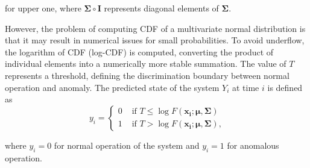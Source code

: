 for upper one, where $\boldsymbol{\Sigma}\circ\boldsymbol{I}$ represents diagonal elements of $\boldsymbol{\Sigma}$.

However, the problem of computing CDF of a multivariate normal distribution is that it may result in numerical issues for small probabilities. To avoid underflow, the logarithm of CDF (log-CDF) is computed, converting the product of individual elements into a numerically more stable summation. The value of $T$ represents a threshold, defining the discrimination boundary between normal operation and anomaly. The predicted state of the system $Y_i$ at time $i$ is defined as
\begin{equation}
y_i =
  \begin{cases}
     0 & \text{ if } T \leq \log{F(\boldsymbol{x_i}; \boldsymbol{\mu}, \boldsymbol{\Sigma})} \\ 
     1 & \text{ if }  T > \log{F(\boldsymbol{x_i}; \boldsymbol{\mu}, \boldsymbol{\Sigma})}\text{,}\label{eq:anomaly}
  \end{cases}
\end{equation}

where $y_i = 0$ for normal operation of the system and $y_i = 1$ for anomalous operation.
